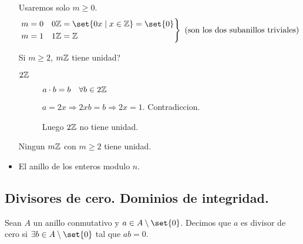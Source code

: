 \begin{itemize}
\begin{remark}
		      Usaremos solo \(m \geq 0\).
		      \[
			      \begin{rcases}
				      m = 0 \quad 0\Z = \set{0x \mid x \in \Z} = \set{0} \\
				      m = 1 \quad 1\Z = \Z
			      \end{rcases}
			      \text{ (son los dos subanillos triviales)}
		      \]
		      
		      Si \(m \geq 2\), \(m\mathbb{Z} \) tiene unidad?
		      \begin{description}
			      \item[\(2\mathbb{Z} \)] \(a \cdot b = b \quad \forall b \in 2\mathbb{Z} \)
				      
				      \(a = 2x \Rightarrow 2x b = b \Rightarrow 2x = 1\). Contradiccion.
				      
				      Luego \(2\mathbb{Z} \) no tiene unidad.
		      \end{description}
		      Ningun \(m\mathbb{Z} \) con \(m \geq 2 \) tiene unidad.
	      \end{remark}
	\item El anillo de los enteros modulo \(n \).
	      
\end{itemize}

\subsection{Divisores de cero. Dominios de integridad.}
\begin{definition}
	Sean \(A \) un anillo conmutativo y \(a \in A \setminus \set{0 }\). Decimos que \(a \) es divisor de cero si \(\exists b \in A \setminus \set{0 }\) tal que \(ab =0 \).
\end{definition}

